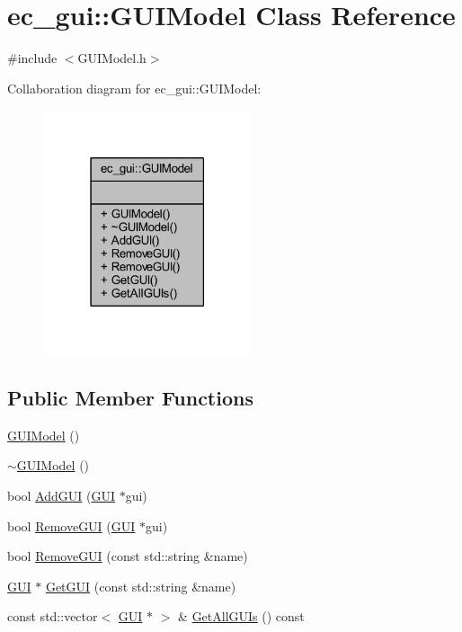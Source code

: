 \hypertarget{classec__gui_1_1_g_u_i_model}{}\section{ec\+\_\+gui\+:\+:G\+U\+I\+Model Class Reference}
\label{classec__gui_1_1_g_u_i_model}


{\ttfamily \#include $<$G\+U\+I\+Model.\+h$>$}



Collaboration diagram for ec\+\_\+gui\+:\+:G\+U\+I\+Model\+:\nopagebreak
\begin{figure}[H]
\begin{center}
\leavevmode
\includegraphics[width=174pt]{classec__gui_1_1_g_u_i_model__coll__graph}
\end{center}
\end{figure}
\subsection*{Public Member Functions}
\begin{DoxyCompactItemize}
\item 
\mbox{\hyperlink{classec__gui_1_1_g_u_i_model_a5bcb7347d71f3c7c0f9b7c37a9309131}{G\+U\+I\+Model}} ()
\item 
\mbox{\hyperlink{classec__gui_1_1_g_u_i_model_a86b0071b77bd25cf8445f18950f22d18}{$\sim$\+G\+U\+I\+Model}} ()
\item 
bool \mbox{\hyperlink{classec__gui_1_1_g_u_i_model_a9bc19762b480dba76f13b15fbdce504e}{Add\+G\+UI}} (\mbox{\hyperlink{classec__gui_1_1_g_u_i}{G\+UI}} $\ast$gui)
\item 
bool \mbox{\hyperlink{classec__gui_1_1_g_u_i_model_a3ee423b1b6717274cac6307b2ab2f601}{Remove\+G\+UI}} (\mbox{\hyperlink{classec__gui_1_1_g_u_i}{G\+UI}} $\ast$gui)
\item 
bool \mbox{\hyperlink{classec__gui_1_1_g_u_i_model_adf602f611086903260ae863b76a164f7}{Remove\+G\+UI}} (const std\+::string \&name)
\item 
\mbox{\hyperlink{classec__gui_1_1_g_u_i}{G\+UI}} $\ast$ \mbox{\hyperlink{classec__gui_1_1_g_u_i_model_abf1f8d1b9e5a4f46458e8759cb8a6123}{Get\+G\+UI}} (const std\+::string \&name)
\item 
const std\+::vector$<$ \mbox{\hyperlink{classec__gui_1_1_g_u_i}{G\+UI}} $\ast$ $>$ \& \mbox{\hyperlink{classec__gui_1_1_g_u_i_model_aa22a88fcfb805aa8dc72205cdcc28c03}{Get\+All\+G\+U\+Is}} () const
\end{DoxyCompactItemize}


